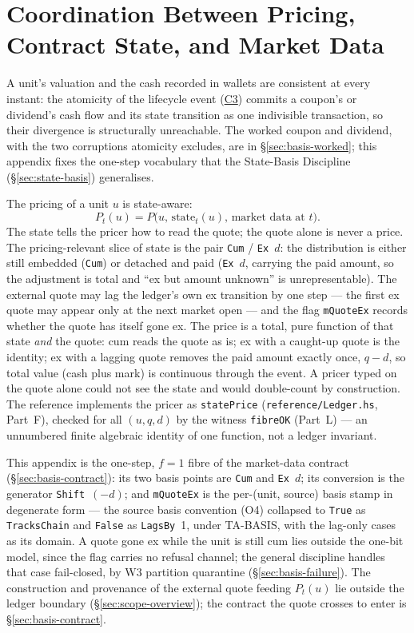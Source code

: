 \section{Coordination Between Pricing, Contract State, and Market Data}
\label{app:pricing-coordination}

A unit's valuation and the cash recorded in wallets are consistent at every instant:
the atomicity of the lifecycle event (\hyperref[cond:C3]{C3}) commits a coupon's or
dividend's cash flow and its state transition as one indivisible transaction, so
their divergence is structurally unreachable. The worked coupon and dividend, with
the two corruptions atomicity excludes, are in \S\ref{sec:basis-worked}; this
appendix fixes the one-step vocabulary that the State-Basis Discipline
(\S\ref{sec:state-basis}) generalises.

The pricing of a unit $u$ is state-aware:
\[
P_t(u) = P\big(u,\, \mathrm{state}_t(u),\, \text{market data at } t\big).
\]
The state tells the pricer how to read the quote; the quote alone is never a price.
The pricing-relevant slice of state is the pair \lstinline|Cum| / \lstinline|Ex|~$d$:
the distribution is either still embedded (\lstinline|Cum|) or detached and paid
(\lstinline|Ex|~$d$, carrying the paid amount, so the adjustment is total and ``ex
but amount unknown'' is unrepresentable). The external quote may lag the ledger's
own ex transition by one step --- the first ex quote may appear only at the next
market open --- and the flag \lstinline|mQuoteEx| records whether the quote has
itself gone ex. The price is a total, pure function of that state \emph{and} the
quote: cum reads the quote as is; ex with a caught-up quote is the identity; ex
with a lagging quote removes the paid amount exactly once, $q-d$, so total value
(cash plus mark) is continuous through the event. A pricer typed on the quote alone
could not see the state and would double-count by construction. The reference
implements the pricer as \texttt{statePrice} (\texttt{reference/Ledger.hs},
Part~F), checked for all $(u,q,d)$ by the witness \texttt{fibreOK} (Part~L) --- an
unnumbered finite algebraic identity of one function, not a ledger invariant.

This appendix is the one-step, $f=1$ fibre of the market-data contract
(\S\ref{sec:basis-contract}): its two basis points are \lstinline|Cum| and
\lstinline|Ex|~$d$; its conversion is the generator \texttt{Shift}~$(-d)$; and
\lstinline|mQuoteEx| is the per-(unit, source) basis stamp in degenerate form ---
the source basis convention (O4) collapsed to \texttt{True} as
\texttt{TracksChain} and \texttt{False} as \texttt{LagsBy}~1, under TA-BASIS, with
the lag-only cases as its domain. A quote gone ex while the unit is still cum lies
outside the one-bit model, since the flag carries no refusal channel; the general
discipline handles that case fail-closed, by W3 partition quarantine
(\S\ref{sec:basis-failure}). The construction and provenance of the external quote
feeding $P_t(u)$ lie outside the ledger boundary (\S\ref{sec:scope-overview}); the
contract the quote crosses to enter is \S\ref{sec:basis-contract}.
